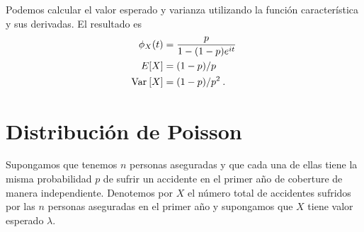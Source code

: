 \documentclass[12pt,reqno]{amsart}\usepackage[]{graphicx}\usepackage[]{color}
\begin{document}
Podemos calcular el valor esperado y varianza utilizando la función característica y sus derivadas. El resultado es
\begin{equation}\label{caracterGeometrica}
  \begin{split}
    \phi_{X}(t) &= \frac{p}{1-(1-p)e^{it}} \\
    E[X] &= (1-p)/p\\
    \mathrm{Var}\: [X] &= (1-p)/p^2\:.
  \end{split}
\end{equation}

\section{Distribución de Poisson}
Supongamos que tenemos $n$ personas aseguradas y que cada una de ellas tiene la misma probabilidad $p$ de sufrir un accidente en el primer año de coberture de manera independiente. Denotemos por $X$ el número total de accidentes sufridos por las $n$ personas aseguradas en el primer año y supongamos que  $X$ tiene valor esperado $\lambda$.
\end{document}
